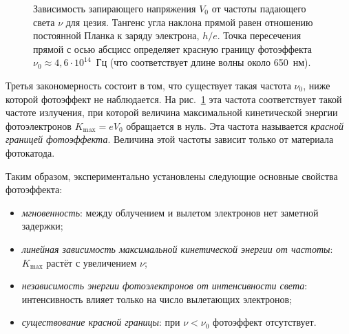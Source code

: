 \documentclass[a4paper, 12pt]{article}
\begin{document}
\begin{figure}[h!]
  \centering
  \caption{Зависимость запирающего напряжения $V_0$ от частоты падающего
  света $\nu$ для цезия. Тангенс угла наклона прямой равен отношению
  постоянной Планка к заряду электрона, $h/e$. Точка пересечения прямой с
  осью абсцисс определяет красную границу фотоэффекта $\nu_0 \approx
  4{,}6 \cdot 10^{14}$~Гц (что соответствует длине волны около 650~нм).}
  \label{fig:stopping-potential-frequency}
\end{figure}

Третья закономерность состоит в том, что существует такая частота $\nu_0$,
ниже которой фотоэффект не наблюдается. На рис.~\ref{fig:stopping-potential-frequency} эта частота соответствует
такой частоте излучения, при которой величина максимальной кинетической энергии
фотоэлектронов $K_{\text{max}} = eV_0$ обращается в нуль. Эта частота называется \emph{красной
границей фотоэффекта}. Величина этой частоты зависит только от материала фотокатода.

Таким образом, экспериментально установлены следующие основные свойства
фотоэффекта:
\begin{itemize}
\item \emph{мгновенность}: между облучением и вылетом электронов нет заметной
  задержки;
\item \emph{линейная зависимость максимальной кинетической энергии от
  частоты}: $K_{\text{max}}$ растёт с увеличением $\nu$;
\item \emph{независимость энергии фотоэлектронов от интенсивности света}:
  интенсивность влияет только на число вылетающих электронов;
\item \emph{существование красной границы}: при $\nu < \nu_0$ фотоэффект
  отсутствует.
\end{itemize}
\end{document}
